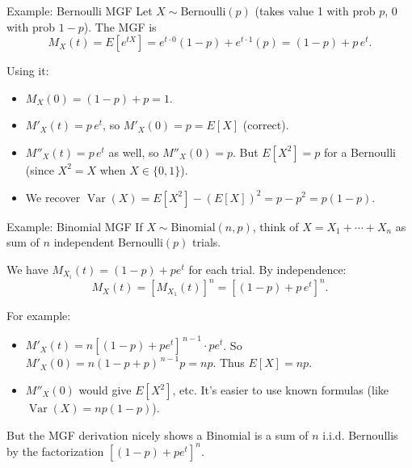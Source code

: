 \documentclass[aspectratio=169,11pt]{beamer} %
\begin{document}
\begin{frame}{Example: Bernoulli MGF}
Let $X \sim \text{Bernoulli}(p)$ (takes value 1 with prob $p$, 0 with prob $1-p$). \newline
The MGF is 
\[ M_X(t) = E[e^{tX}] = e^{t \cdot 0}(1-p) + e^{t \cdot 1}(p) = (1-p) + p\,e^t.\]

Using it:
\begin{itemize}
    \item $M_X(0) = (1-p)+p = 1$.
    \item $M'_X(t) = p\,e^t$, so $M'_X(0) = p = E[X]$ (correct).
    \item $M''_X(t) = p\,e^t$ as well, so $M''_X(0) = p$. But $E[X^2] = p$ for a Bernoulli (since $X^2=X$ when $X\in\{0,1\}$).
    \item We recover $\operatorname{Var}(X) = E[X^2] - (E[X])^2 = p - p^2 = p(1-p)$.
\end{itemize}
\end{frame}

\begin{frame}{Example: Binomial MGF}
If $X \sim \text{Binomial}(n,p)$, think of $X = X_1 + \cdots + X_n$ as sum of $n$ independent $\text{Bernoulli}(p)$ trials. \newline

We have $M_{X_i}(t) = (1-p) + p e^t$ for each trial. By independence:
\[ M_X(t) = [M_{X_1}(t)]^n = [(1-p) + p\,e^t]^n.\]

For example:
\begin{itemize}
    \item $M'_X(t) = n[(1-p)+p e^t]^{\,n-1} \cdot p e^t$. So $M'_X(0) = n(1-p+p)^{\,n-1} p = np$. Thus $E[X]=np$.
    \item $M''_X(0)$ would give $E[X^2]$, etc. It's easier to use known formulas (like $\operatorname{Var}(X)=np(1-p)$).
\end{itemize}
But the MGF derivation nicely shows a Binomial is a sum of $n$ i.i.d. Bernoullis by the factorization $[(1-p)+pe^t]^n$.
\end{frame}
\end{document}
